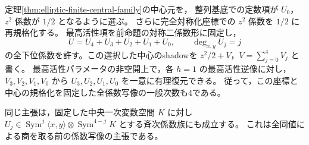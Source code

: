 \begin{corollary}[規格化した係数族における下位項の三角復元]
\label{cor:binary-shadow-lower-triangular}
定理\ref{thm:elliptic-finite-central-family}の中心元を，
整列基底での定数項が $U_0$，$z^2$ 係数が $1/2$ となるように選ぶ。
さらに完全対称化座標での $z^2$ 係数を $1/2$ に再規格化する。
最高活性項を前命題の対称二係数形に固定し，
\[
 U=U_4+U_3+U_2+U_1+U_0,
 \qquad \deg_{x,y}U_j=j
\]
の全下位係数を許す。この選択した中心のshadowを
$z^2/2+V$，$V=\sum_{j=0}^4V_j$ と書く。
最高活性パラメータの非空開上で，各 $h=1$ の最高活性逆像に対し，
$V_3,V_2,V_1,V_0$ から $U_3,U_2,U_1,U_0$ を一意に有理復元できる。
従って，この座標と中心の規格化を固定した全係数写像の一般次数も4である。

同じ主張は，固定した中央一次変数空間 $K$ に対し
$U_j\in\operatorname{Sym}^j\langle x,y\rangle
\otimes\operatorname{Sym}^{4-j}K$ とする斉次係数族にも成立する。
これは全同値による商を取る前の係数写像の主張である。
\end{corollary}
